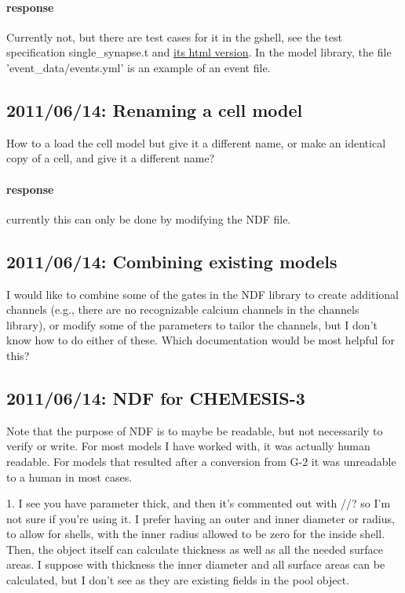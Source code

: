 \documentclass[12pt]{article}
\begin{document}
\paragraph{response} Currently not, but there are test cases for it in
the gshell, see the test specification single\_synapse.t and
\href{http://neurospaces.sourceforge.net/neurospaces_project/gshell/tests/html/specifications/single_synapse.html}{its
  html version}.  In the model library, the file
'event\_data/events.yml' is an example of an event file.


\subsection{2011/06/14: Renaming a cell model}

How to a load the cell model but give it a different name, or make an
identical copy of a cell, and give it a different name?

\paragraph{response} currently this can only be done by modifying the
NDF file.


\subsection{2011/06/14: Combining existing models}

I would like to combine some of the gates in the NDF library to create
additional channels (e.g., there are no recognizable calcium channels
in the channels library), or modify some of the parameters to tailor
the channels, but I don't know how to do either of these.  Which
documentation would be most helpful for this?


\subsection{2011/06/14: NDF for CHEMESIS-3}

Note that the purpose of NDF is to maybe be readable, but not
necessarily to verify or write.  For most models I have worked with,
it was actually human readable.  For models that resulted after a
conversion from G-2 it was unreadable to a human in most cases.



1. I see you have parameter thick, and then it's commented out with
//? so I'm not sure if you're using it.  I prefer having an outer and
inner diameter or radius, to allow for shells, with the inner radius
allowed to be zero for the inside shell.  Then, the object itself can
calculate thickness as well as all the needed surface areas.  I
suppose with thickness the inner diameter and all surface areas can be
calculated, but I don't see as they are existing fields in the pool
object.
\end{document}
